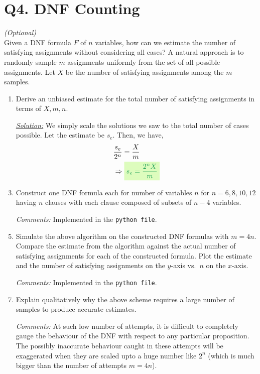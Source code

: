 \documentclass[12pt,titlepage]{report}
\begin{document}
\section*{\hypertarget{q4}{Q4. DNF Counting}}
\vspace{-1cm}
\null\hfill \textit{(Optional)}\\
Given a DNF formula $F$ of $n$ variables, how can we estimate the number of satisfying assignments without considering all cases? A natural approach is to randomly sample $m$ assignments uniformly from the set of all possible assignments. Let $X$ be the number of satisfying assignments among the $m$ samples.
\begin{enumerate}[label=(\alph*)]
    \item Derive an unbiased estimate for the total number of satisfying assignments in terms of $X, m, n$.
    \item[\underline{\textit{Solution:}}] We simply scale the solutions we saw to the total number of cases possible. Let the estimate be $s_e$.
    Then, we have,
    \begin{align*}
        &\frac{s_e}{2^n} = \frac{X}{m} \\
        &\Rightarrow \ans{$s_e =\dfrac{2^nX}{m}$} 
    \end{align*}
    
    \item Construct one DNF formula each for number of variables $n$ for $n = 6, 8, 10, 12$ having $n$ clauses with each clause composed of subsets of $n-4$ variables.
    \item[\textit{Comments:}] Implemented in the \texttt{python file}.
    
    \item Simulate the above algorithm on the constructed DNF formulas with $m = 4n$. Compare the estimate from the algorithm against the actual number of satisfying assignments for each of the constructed formula. Plot the estimate and the number of satisfying assignments on the $y$-axis vs.\ $n$ on the $x$-axis.
    \item[\textit{Comments:}] Implemented in the \texttt{python file}.
    
    \item Explain qualitatively why the above scheme requires a large number of samples to produce accurate estimates.
    \item[\textit{Comments:}] At such low number of attempts, it is difficult to completely gauge the behaviour of the DNF with respect to any particular proposition.\\
    The possibly inaccurate behaviour caught in these attempts will be exaggerated when they are scaled upto a huge number like $2^n$ (which is much bigger than the number of attempts $m=4n$).
\end{enumerate}
\end{document}
